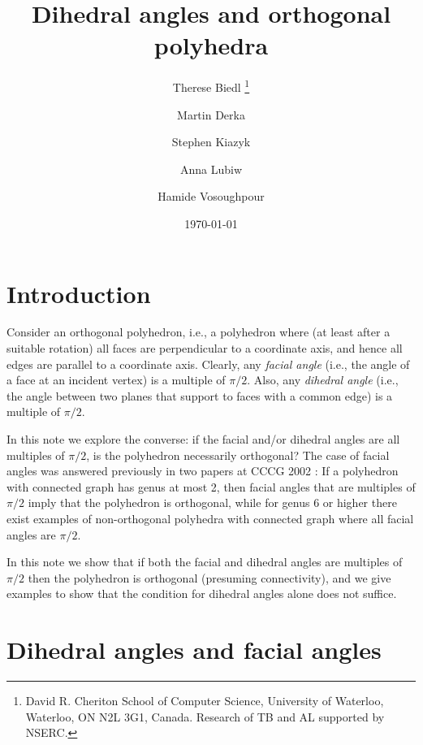 \documentclass[12pt]{article}
\begin{document}
\title{Dihedral angles and orthogonal polyhedra}
\author{Therese Biedl 
\thanks{David R. Cheriton School of Computer Science, University of Waterloo, 
Waterloo, ON N2L 3G1, Canada.
Research of TB and AL supported by NSERC.}
\and Martin Derka 
\addtocounter{footnote}{-1}\footnotemark
\and Stephen Kiazyk 
\addtocounter{footnote}{-1}\footnotemark
\and
Anna Lubiw 
\addtocounter{footnote}{-1}\footnotemark
\and Hamide Vosoughpour
\addtocounter{footnote}{-1}\footnotemark
}
\date{\today}

\maketitle

\section{Introduction}

Consider an orthogonal polyhedron, i.e., a polyhedron where (at
least after a suitable rotation) all faces are perpendicular to a coordinate
axis, and hence all edges are parallel to a coordinate axis.  Clearly,
any {\em facial angle} (i.e., the angle of a face at an incident vertex)
is a multiple of $\pi/2$.  Also, any {\em dihedral angle} (i.e., the
angle between two planes that support to faces with a common edge) is
a multiple of $\pi/2$.

In this note we explore the converse: if the facial and/or dihedral angles are all multiples 
of $\pi /2$, is the polyhedron necessarily orthogonal?  
The case of facial angles was answered previously 
in two papers at CCCG 2002 
\cite{DO-CCCG02,BCD+-CCCG02}: If a polyhedron with connected graph
has genus at most 2,
then facial angles that are multiples of $\pi/2$ imply that the
polyhedron is orthogonal, while for genus 6 or higher there exist
examples of non-orthogonal polyhedra with connected graph
where all facial angles are $\pi/2$.  

In this note we show that if both the facial and dihedral angles are multiples of $\pi /2$ 
then the polyhedron is orthogonal (presuming connectivity), 
and we give examples to show that the condition for dihedral 
angles alone does not suffice.

\section{Dihedral angles and facial angles}
\end{document}
